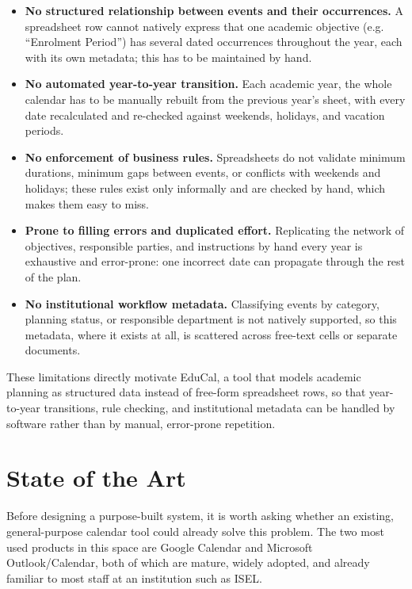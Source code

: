 \begin{itemize}
    \item \textbf{No structured relationship between events and their occurrences.} A spreadsheet row cannot natively express that one academic objective (e.g. ``Enrolment Period'') has several dated occurrences throughout the year, each with its own metadata; this has to be maintained by hand.
    \item \textbf{No automated year-to-year transition.} Each academic year, the whole calendar has to be manually rebuilt from the previous year's sheet, with every date recalculated and re-checked against weekends, holidays, and vacation periods.
    \item \textbf{No enforcement of business rules.} Spreadsheets do not validate minimum durations, minimum gaps between events, or conflicts with weekends and holidays; these rules exist only informally and are checked by hand, which makes them easy to miss.
    \item \textbf{Prone to filling errors and duplicated effort.} Replicating the network of objectives, responsible parties, and instructions by hand every year is exhaustive and error-prone: one incorrect date can propagate through the rest of the plan.
    \item \textbf{No institutional workflow metadata.} Classifying events by category, planning status, or responsible department is not natively supported, so this metadata, where it exists at all, is scattered across free-text cells or separate documents.
\end{itemize}

These limitations directly motivate EduCal, a tool that models academic planning as structured data instead of free-form spreadsheet rows, so that year-to-year transitions, rule checking, and institutional metadata can be handled by software rather than by manual, error-prone repetition.

\section{State of the Art} \label{sec:state-of-the-art}

Before designing a purpose-built system, it is worth asking whether an existing, general-purpose calendar tool could already solve this problem. The two most used products in this space are Google Calendar and Microsoft Outlook/Calendar, both of which are mature, widely adopted, and already familiar to most staff at an institution such as ISEL.

